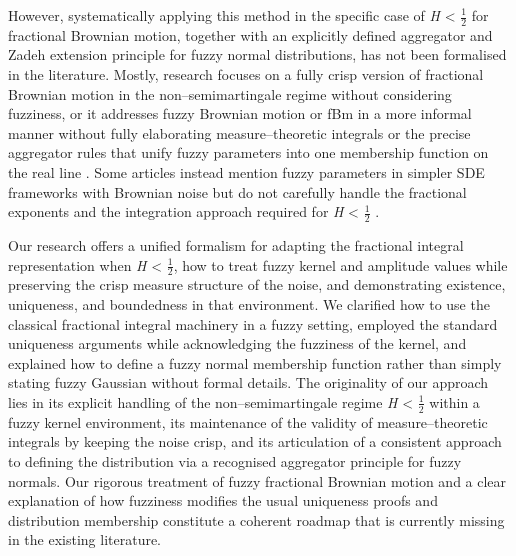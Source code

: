 \documentclass[12pt,a4paper]{report}
\numberwithin{equation}{section}
\begin{document}
However, systematically applying this method in the specific case of
\emph{H} \textless{} $\frac{1}{2}$ for fractional Brownian motion, together with an
explicitly defined aggregator and Zadeh extension principle for fuzzy
normal distributions, has not been formalised in the literature. Mostly,
research focuses on a fully crisp version of fractional Brownian motion
in the non--semimartingale regime without considering fuzziness, or it
addresses fuzzy Brownian motion or fBm in a more informal manner without
fully elaborating measure--theoretic integrals or the precise aggregator
rules that unify fuzzy parameters into one membership function on the
real line \cite{muzzioli2017fuzzy_94} \cite{nowak2017option_95} \cite{nowak2019pricing_96}. Some articles instead mention
fuzzy parameters in simpler SDE frameworks with Brownian noise but do
not carefully handle the fractional exponents and the integration
approach required for \emph{H} \textless{} $\frac{1}{2}$ \cite{li2018application_97} \cite{wang2016geometric_98} \cite{nowak2014application_99}
\cite{zhang2015fuzzy_100} \cite{muzzioli2015comparison_101} \cite{nowak2010computing_102} \cite{lee2005new_103} \cite{wu2004pricing_104} \cite{wu2005european_105} \cite{wu2007using_106}.

Our research offers a unified formalism for adapting the fractional
integral representation when \emph{H} \textless{} $\frac{1}{2}$, how to treat fuzzy
kernel and amplitude values while preserving the crisp measure structure
of the noise, and demonstrating existence, uniqueness, and boundedness
in that environment. We clarified how to use the classical fractional
integral machinery in a fuzzy setting, employed the standard uniqueness
arguments while acknowledging the fuzziness of the kernel, and explained
how to define a fuzzy normal membership function rather than simply
stating fuzzy Gaussian without formal details. The originality of our
approach lies in its explicit handling of the non--semimartingale regime
\emph{H} \textless{} $\frac{1}{2}$ within a fuzzy kernel environment, its
maintenance of the validity of measure--theoretic integrals by keeping
the noise crisp, and its articulation of a consistent approach to
defining the distribution via a recognised aggregator principle for
fuzzy normals. Our rigorous treatment of fuzzy fractional Brownian
motion and a clear explanation of how fuzziness modifies the usual
uniqueness proofs and distribution membership constitute a coherent
roadmap that is currently missing in the existing literature.
\end{document}
